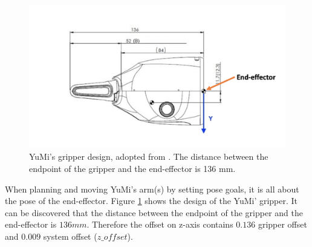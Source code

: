 \begin{figure}[H]
\centering
\includegraphics[width = 0.8\columnwidth]{Implementation/mp/gripperoffset.png}
\caption{YuMi's gripper design, adopted from \citep{ABBsDual5:online}. The distance between the endpoint of the gripper and the end-effector is 136 mm.}
\label{gripperoffset}
\end{figure}

When planning and moving YuMi's arm(s) by setting pose goals, it is all about the pose of the end-effector. Figure \ref{gripperoffset} shows the design of the YuMi' gripper. It can be discovered that the distance between the endpoint of the gripper and the end-effector is $136mm$. Therefore the offset on z-axis contains $0.136$ gripper offset and $0.009$ system offset ($z\_offset$).

